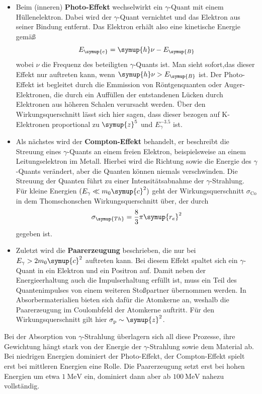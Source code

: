 \begin{itemize}
    \item Beim (inneren) \textbf{Photo-Effekt} wechselwirkt ein $\gamma$-Quant mit einem Hüllenelektron.
    Dabei wird der $\gamma$-Quant vernichtet und das Elektron aus seiner Bindung entfernt.
    Das Elektron erhält also eine kinetische Energie gemäß
    \begin{equation*}
        E_{\symup{e}} = \symup{h}\nu - E_{\symup{B}}
    \end{equation*}
    wobei $\nu$ die Frequenz des beteiligten $\gamma$-Quants ist. Man sieht sofort,das dieser Effekt nur
    auftreten kann, wenn $\symup{h}\nu > E_{\symup{B}}$ ist.
    Der Photo-Effekt ist begleitet durch die Emmission von Röntgenquanten oder Auger-Elektronen, die durch
    ein Auffüllen der entstandenen Lücken durch Elektronen aus höheren Schalen verursacht werden.
    Über den Wirkungsquerschnitt lässt sich hier sagen, dass dieser bezogen auf K-Elektronen
    proportional zu $\symup{z}^5$ und $E_\gamma^{-3.5}$ ist.

    \item Als nächstes wird der \textbf{Compton-Effekt} behandelt, er beschreibt die Streuung eines
    $\gamma$-Quants an einem freien Elektron, beispielsweise an einem Leitungselektron im Metall.
    Hierbei wird die Richtung sowie die Energie des $\gamma$-Quants verändert, aber die Quanten können
    niemals verschwinden. Die Streuung der Quanten führt zu einer Intensitätsabnahme der $\gamma$-Strahlung.
    Für kleine Energien $(E_\gamma \ll m_0 \symup{c}^2)$ geht der Wirkungsquerschnitt $\sigma_{\text{Co}}$
    in dem Thomschonschen Wirkungsquerschnitt über, der durch
    \begin{equation}
        \label{sigma_th}
        \sigma_{\symup{Th}} = \frac{8}{3}\pi \symup{r_e}^2
    \end{equation}
    gegeben ist.

    \item Zuletzt wird die \textbf{Paarerzeugung} beschrieben, die nur bei $E_\gamma > 2m_0 \symup{c}^2$ auftreten kann.
    Bei diesem Effekt spaltet sich ein $\gamma$-Quant in ein Elektron und ein Positron auf.
    Damit neben der Energieerhaltung auch die Impulserhaltung erfüllt ist, muss ein Teil des Quantenimpulses von
    einem weiteren Stoßpartner übernommen werden. In Absorbermaterialien bieten sich dafür die Atomkerne an,
    weshalb die Paarerzeugung im Coulombfeld der Atomkerne auftritt.
    Für den Wirkungsquerschnitt gilt hier $\sigma_{\text{p}} \sim \symup{z}^2$.
\end{itemize}

Bei der Absorption von $\gamma$-Strahlung überlagern sich all diese Prozesse, ihre Gewichtung hängt stark von der
Energie der $\gamma$-Strahlung sowie dem Material ab.
Bei niedrigen Energien dominiert der Photo-Effekt, der Compton-Effekt spielt erst bei mittleren Energien eine Rolle.
Die Paarerzeugung setzt erst bei hohen Energien um etwa $\qty{1}{\mega\electronvolt}$ ein, dominiert dann aber
ab $\qty{100}{\mega\electronvolt}$ nahezu vollständig.